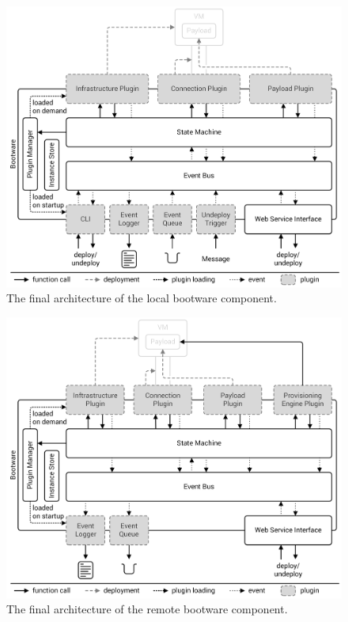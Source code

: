 \begin{figure}[!htbp]
	\centering
	\includegraphics[resolution=600]{design/assets/final_architecture_local}
	\caption{The final architecture of the local bootware component.}
	\label{image:finalarchlocal}
\end{figure}

\begin{figure}[!htbp]
	\centering
	\includegraphics[resolution=600]{design/assets/final_architecture_remote}
	\caption{The final architecture of the remote bootware component.}
	\label{image:finalarchremote}
\end{figure}

